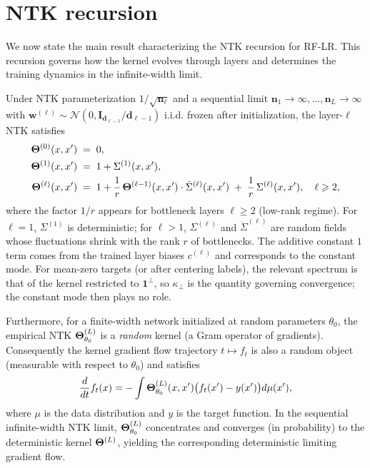 \section{NTK recursion}\label{sec:recursion}

We now state the main result characterizing the NTK recursion for RF-LR. This recursion governs how the kernel evolves through layers and determines the training dynamics in the infinite-width limit.

\begin{theorem}\label{thm:ntk_recursion}
Under NTK parameterization \( 1/\sqrt{\bm{n}_\ell} \) and a sequential limit \( \bm{n}_1\to\infty,\dots,\bm{n}_L\to\infty \) with \( \bm{w}^{(\ell)} \sim \mathcal{N}(0, \mathbf{I}_{\bm{d}_{\ell-1}}/\bm{d}_{\ell-1}) \) i.i.d. frozen after initialization, the layer-\( \ell \) NTK satisfies
\begin{align}
\boldsymbol{\Theta}^{(0)}(x,x') \;&=\; 0, \\
\boldsymbol{\Theta}^{(1)}(x,x') \;&=\; 1 + \Sigma^{(1)}(x,x'), \\
\boldsymbol{\Theta}^{(\ell)}(x,x') \;&=\; 1 + \frac{1}{r}\,\boldsymbol{\Theta}^{(\ell-1)}(x,x')\cdot\dot{\Sigma}^{(\ell)}(x,x')\;+\;\frac{1}{r}\,\Sigma^{(\ell)}(x,x'),\quad \ell\geqslant2,
\end{align}
where the factor \( 1/r \) appears for bottleneck layers \( \ell \ge 2 \) (low-rank regime). For \( \ell=1 \), \( \Sigma^{(1)} \) is deterministic; for \( \ell>1 \), \( \Sigma^{(\ell)} \) and \( \dot{\Sigma}^{(\ell)} \) are random fields whose fluctuations shrink with the rank \( r \) of bottlenecks.
The additive constant \(1\) term comes from the trained layer biases \(c^{(\ell)}\) and corresponds to the constant mode. For mean-zero targets (or after centering labels), the relevant spectrum is that of the kernel restricted to \(\mathbf{1}^\perp\), so \(\kappa_\perp\) is the quantity governing convergence; the constant mode then plays no role.

Furthermore, for a finite-width network initialized at random parameters \(\theta_0\), the empirical NTK \(\boldsymbol{\Theta}^{(L)}_{\theta_0}\) is a \emph{random} kernel (a Gram operator of gradients). Consequently the kernel gradient flow trajectory \(t\mapsto f_t\) is also a random object (measurable with respect to \(\theta_0\)) and satisfies
\[
\frac{d}{dt}f_t(x) = -\int \boldsymbol{\Theta}^{(L)}_{\theta_0}(x,x') \big(f_t(x') - y(x')\big) d\mu(x'),
\]
where \( \mu \) is the data distribution and \( y \) is the target function. In the sequential infinite-width NTK limit, \(\boldsymbol{\Theta}^{(L)}_{\theta_0}\) concentrates and converges (in probability) to the deterministic kernel \(\boldsymbol{\Theta}^{(L)}\), yielding the corresponding deterministic limiting gradient flow.
\end{theorem}

